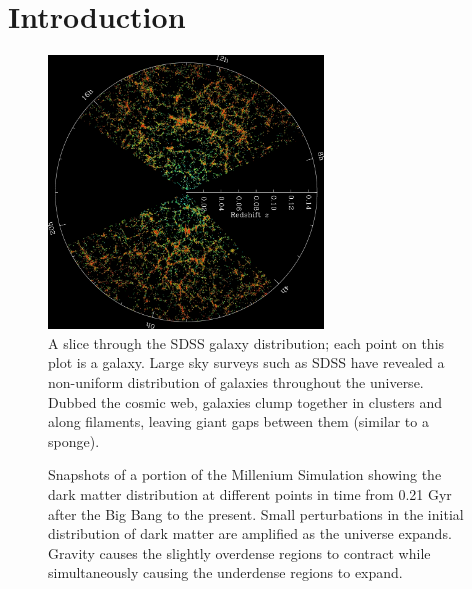 \chapter{Introduction}



\begin{figure}
    \includegraphics[width=0.65\textwidth]{Images/Intro/sdss}
    \caption[SDSS galaxy map]{A slice through the SDSS galaxy distribution; each 
    point on this plot is a galaxy.  Large sky surveys such as SDSS have 
    revealed a non-uniform distribution of galaxies throughout the universe.  
    Dubbed the cosmic web, galaxies clump together in clusters and along 
    filaments, leaving giant gaps between them (similar to a sponge).}
    \label{fig:SDSS_map}
\end{figure}

\begin{figure}
    \caption[Dark matter simulation]{Snapshots of a portion of the Millenium 
    Simulation showing the dark matter distribution at different points in time 
    from 0.21 Gyr after the Big Bang to the present.  Small perturbations in the 
    initial distribution of dark matter are amplified as the universe expands.  
    Gravity causes the slightly overdense regions to contract while 
    simultaneously causing the underdense regions to expand.}
    \label{fig:DMsim}
\end{figure}

